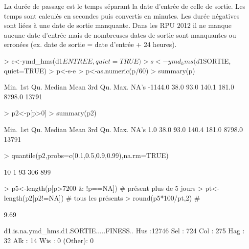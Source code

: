 \documentclass[12pt,english,french]{report}
\begin{document}
La durée de passage est le temps séparant la date d'entrée de celle de sortie. Les temps sont calculés en secondes puis convertis en minutes. Les durée négatives sont liées à une date de sortie manquante. Dans les RPU 2012 il ne manque aucune date d'entrée mais de nombreuses dates de sortie sont manquantes ou erronées (ex. date de sortie = date d'entrée + 24 heures).
\begin{Schunk}
\begin{Sinput}
> e<-ymd_hms(d1$ENTREE, quiet=TRUE)
> s<-ymd_hms(d1$SORTIE, quiet=TRUE)
> p<-s-e
> p<-as.numeric(p/60)
> summary(p)
\end{Sinput}
\begin{Soutput}
   Min. 1st Qu.  Median    Mean 3rd Qu.    Max.    NA's 
-1144.0    38.0    93.0   140.1   181.0  8798.0   13791 
\end{Soutput}
\begin{Sinput}
> p2<-p[p>0]
> summary(p2)
\end{Sinput}
\begin{Soutput}
   Min. 1st Qu.  Median    Mean 3rd Qu.    Max.    NA's 
    1.0    38.0    93.0   140.4   181.0  8798.0   13791 
\end{Soutput}
\begin{Sinput}
> quantile(p2,probs=c(0.1,0.5,0.9,0.99),na.rm=TRUE)
\end{Sinput}
\begin{Soutput}
10%
  1  93 306 899 
\end{Soutput}
\begin{Sinput}
> p5<-length(p[p>7200 & !p==NA]) # présent plus de 5 jours
> pt<-length(p2[p2!=NA]) # tous les présents
> round(p5*100/pt,2) # %
\end{Sinput}
\begin{Soutput}
[1] 9.69
\end{Soutput}
\begin{Soutput}
 d1.is.na.ymd_hms.d1.SORTIE.....FINESS..
 Hus    :12746                          
 Sel    :  724                          
 Col    :  275                          
 Hag    :   32                          
 Alk    :   14                          
 Wis    :    0                          
 (Other):    0                          
\end{Soutput}
\begin{Sinput}

\end{Sinput}
\end{Schunk}
\end{document}
